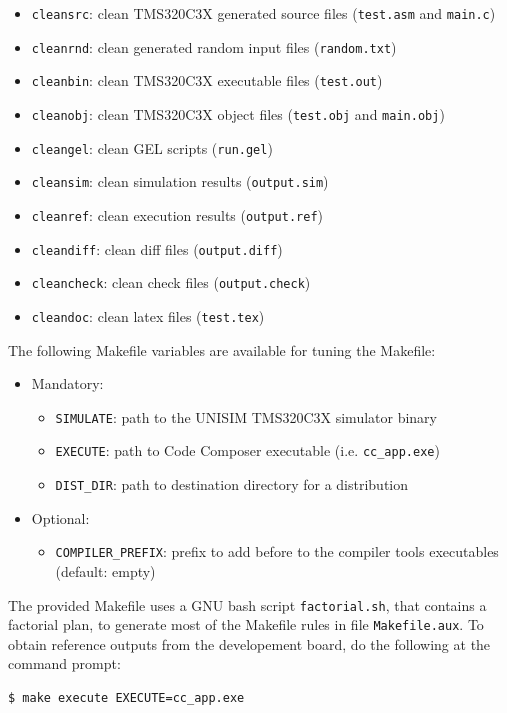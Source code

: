 \begin{itemize}
\item \texttt{cleansrc}: clean TMS320C3X generated source files (\texttt{test.asm} and \texttt{main.c})
\item \texttt{cleanrnd}: clean generated random input files (\texttt{random.txt})
\item \texttt{cleanbin}: clean TMS320C3X executable files (\texttt{test.out})
\item \texttt{cleanobj}: clean TMS320C3X object files (\texttt{test.obj} and \texttt{main.obj})
\item \texttt{cleangel}: clean GEL scripts (\texttt{run.gel})
\item \texttt{cleansim}: clean simulation results (\texttt{output.sim})
\item \texttt{cleanref}: clean execution results (\texttt{output.ref})
\item \texttt{cleandiff}: clean diff files (\texttt{output.diff})
\item \texttt{cleancheck}: clean check files (\texttt{output.check})
\item \texttt{cleandoc}: clean latex files (\texttt{test.tex})
\end{itemize}

\noindent The following Makefile variables are available for tuning the Makefile:
\begin{itemize}
\item Mandatory:
	\begin{itemize}
	\item \texttt{SIMULATE}: path to the UNISIM TMS320C3X simulator binary
	\item \texttt{EXECUTE}: path to Code Composer executable (i.e. \texttt{cc\_app.exe})
	\item \texttt{DIST\_DIR}: path to destination directory for a distribution
	\end{itemize}
\item Optional:
	\begin{itemize}
	\item \texttt{COMPILER\_PREFIX}: prefix to add before to the compiler tools executables (default: empty)
	\end{itemize}
\end{itemize}

The provided Makefile uses a GNU bash script \texttt{factorial.sh}, that contains a factorial plan, to generate most of the Makefile rules in file \texttt{Makefile.aux}.
To obtain reference outputs from the developement board, do the following at the command prompt:
\begin{verbatim}
$ make execute EXECUTE=cc_app.exe
\end{verbatim}

